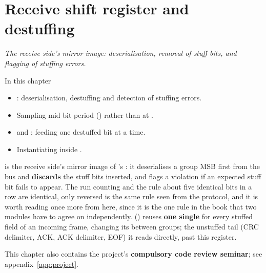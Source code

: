 
\chapter{Receive shift register and destuffing}
\label{c15:ch}

{\large\itshape The receive side's mirror image: deserialisation, removal of stuff bits, and flagging
of stuffing errors.\par}

\begin{chapterbox}{In this chapter}
\begin{itemize}
  \item {}: deserialisation, destuffing and detection of stuffing errors.
  \item Sampling mid bit period () rather than at .
  \item {} and : feeding  one destuffed bit at a time.
  \item Instantiating  inside .
\end{itemize}
\end{chapterbox}

 is the receive side's mirror image of 's : it
deserialises a group MSB first from the bus and \textbf{discards} the stuff bits 
inserted, and flags a violation if an expected stuff bit fails to appear. The run counting and the
rule about five identical bits in a row are identical, only reversed \textemdash{}  is the
same rule seen from the protocol, and it is worth reading once more from here, since it is the one
rule in the book that two modules have to agree on independently. 
() reuses \textbf{one single}  for every stuffed field of an
incoming frame, changing its  between groups; the unstuffed tail (CRC delimiter, ACK,
ACK delimiter, EOF) it reads directly, past this register.

This chapter also contains the project's \textbf{compulsory code review seminar}; see
appendix~\ref{app:project}.




